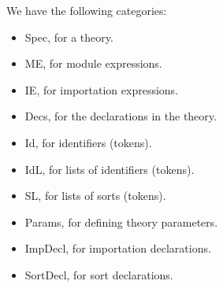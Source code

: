 We have the following categories:
\begin{itemize}
\item
Spec, for a theory.

\item
ME, for module expressions.

\item
IE, for importation expressions.

\item
Decs, for the declarations in the theory.

\item
Id, for identifiers (tokens).

\item
IdL, for lists of identifiers (tokens).

\item
SL, for lists of sorts (tokens).

\item
Params, for defining theory parameters.

\item
ImpDecl, for importation declarations.

\item
SortDecl, for sort declarations.
\end{itemize}




















